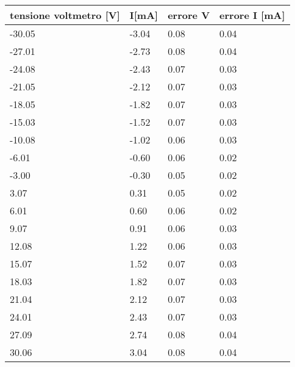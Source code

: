 \begin{tabular}{llll}
\toprule
tensione voltmetro [V] & I[mA] & errore V & errore I [mA] \\
\midrule
-30.05 & -3.04 & 0.08 & 0.04 \\
-27.01 & -2.73 & 0.08 & 0.04 \\
-24.08 & -2.43 & 0.07 & 0.03 \\
-21.05 & -2.12 & 0.07 & 0.03 \\
-18.05 & -1.82 & 0.07 & 0.03 \\
-15.03 & -1.52 & 0.07 & 0.03 \\
-10.08 & -1.02 & 0.06 & 0.03 \\
-6.01 & -0.60 & 0.06 & 0.02 \\
-3.00 & -0.30 & 0.05 & 0.02 \\
3.07 & 0.31 & 0.05 & 0.02 \\
6.01 & 0.60 & 0.06 & 0.02 \\
9.07 & 0.91 & 0.06 & 0.03 \\
12.08 & 1.22 & 0.06 & 0.03 \\
15.07 & 1.52 & 0.07 & 0.03 \\
18.03 & 1.82 & 0.07 & 0.03 \\
21.04 & 2.12 & 0.07 & 0.03 \\
24.01 & 2.43 & 0.07 & 0.03 \\
27.09 & 2.74 & 0.08 & 0.04 \\
30.06 & 3.04 & 0.08 & 0.04 \\
\bottomrule
\end{tabular}
